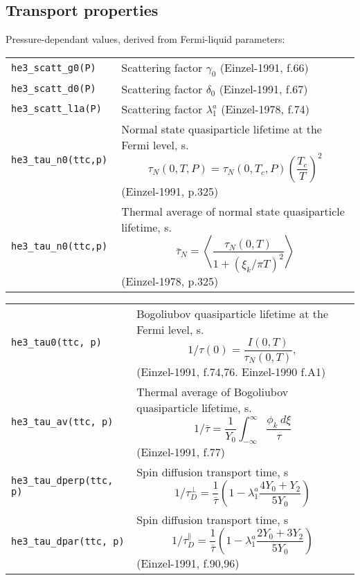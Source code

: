 \documentclass[a4paper]{article}
\begin{document}
\subsection*{Transport properties}

Pressure-dependant values, derived from Fermi-liquid parameters:

\medskip
\begin{tabular}{lp{9cm}}
\tt he3\_scatt\_g0(P)  & Scattering factor $\gamma_0$ {\small(Einzel-1991, f.66)}\\
\tt he3\_scatt\_d0(P)  & Scattering factor $\delta_0$ {\small(Einzel-1991, f.67)}\\
\tt he3\_scatt\_l1a(P) & Scattering factor $\lambda_1^a$ {\small(Einzel-1978, f.74)}\\

\tt he3\_tau\_n0(ttc,p) &Normal state quasiparticle lifetime at the Fermi level, s.
                    $$\tau_N(0,T,P) = \tau_N(0,T_c,P) \left(\frac{T_c}{T}\right)^2$$
                    {\small(Einzel-1991, p.325)}\\
\tt he3\_tau\_n0(ttc,p) &Thermal average of normal state quasiparticle lifetime, s.
                    $$\bar\tau_N = \left<\frac{\tau_N(0,T)}{1+(\xi_k/\pi T)^2}\right>$$
                    {\small(Einzel-1978, p.325)}\\
\end{tabular}
\medskip

\medskip
\begin{tabular}{lp{9cm}}
\tt he3\_tau0(ttc, p)      & Bogoliubov quasiparticle lifetime at the Fermi level, s.
                           $$1/\tau(0) = \frac{I (0,T)}{\tau_N(0,T)},$$
                            {\small(Einzel-1991, f.74,76. Einzel-1990 f.A1)}\\

\tt he3\_tau\_av(ttc, p)   & Thermal average of Bogoliubov quasiparticle lifetime, s.
                           $$1/\bar\tau = \frac{1}{Y_0}
                           \int_{-\infty}^{\infty} \frac{\phi_k\ d\xi}{\tau}$$
                            {\small(Einzel-1991, f.77)}\\

\tt he3\_tau\_dperp(ttc, p) & Spin diffusion transport time, s
                           $$1/\tau_D^\perp = \frac{1}{\bar\tau}
                            \left(1-\lambda_1^a \frac{4Y_0 + Y_2}{5Y_0}\right)$$ \\

\tt he3\_tau\_dpar(ttc, p) & Spin diffusion transport time, s
                           $$1/\tau_D^\parallel = \frac{1}{\bar\tau}
                            \left(1-\lambda_1^a \frac{2Y_0 + 3Y_2}{5Y_0}\right)$$
                            {\small(Einzel-1991, f.90,96)}\\
\end{tabular}
\medskip
\end{document}
